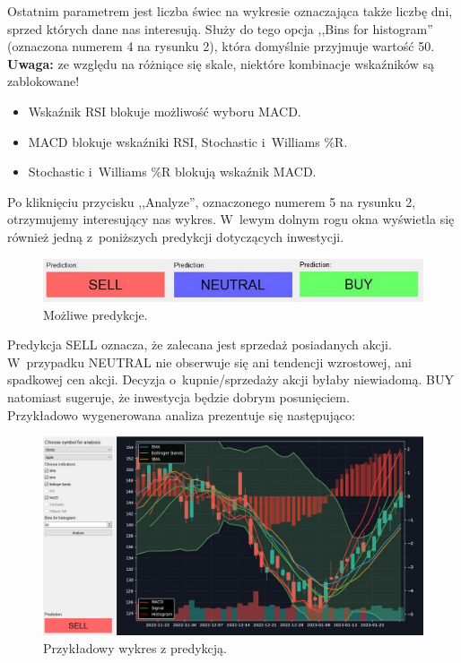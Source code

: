 \documentclass[12pt]{article}
\begin{document}
    Ostatnim parametrem jest liczba świec na wykresie oznaczająca także liczbę dni, sprzed których dane nas interesują.
	Służy do tego opcja ,,Bins for histogram'' (oznaczona numerem 4 na rysunku 2), która domyślnie przyjmuje wartość 50.\\

    \textbf{Uwaga:} ze względu na różniące się skale, niektóre kombinacje wskaźników są zablokowane!

    \begin{itemize}
        \item Wskaźnik RSI blokuje możliwość wyboru MACD\@.
        \item MACD blokuje wskaźniki RSI, Stochastic i~Williams \%R\@.
        \item Stochastic i~Williams \%R blokują wskaźnik MACD\@.
    \end{itemize}

    Po kliknięciu przycisku ,,Analyze'', oznaczonego numerem 5 na rysunku 2,
	otrzymujemy interesujący nas wykres.
	W~lewym dolnym rogu okna wyświetla się również jedną z~poniższych predykcji dotyczących inwestycji.

    \begin{figure}[H]
        \centering
        \includegraphics[scale=0.5]{pics/predykcje}
        \caption{Możliwe predykcje.}\label{fig:figure5}
	\end{figure}

    Predykcja SELL oznacza, że zalecana jest sprzedaż posiadanych akcji.
	W~przypadku NEUTRAL nie obserwuje się ani tendencji wzrostowej, ani spadkowej cen akcji.
	Decyzja o~kupnie/sprzedaży akcji byłaby niewiadomą.
	BUY natomiast sugeruje, że inwestycja będzie dobrym posunięciem.\\

    \newpage
    Przykładowo wygenerowana analiza prezentuje się następująco:

    \begin{figure}[H]
        \centering
        \includegraphics[scale=0.4]{pics/wykres}
        \caption{Przykładowy wykres z predykcją.}\label{fig:figure6}
	\end{figure}
\end{document}
